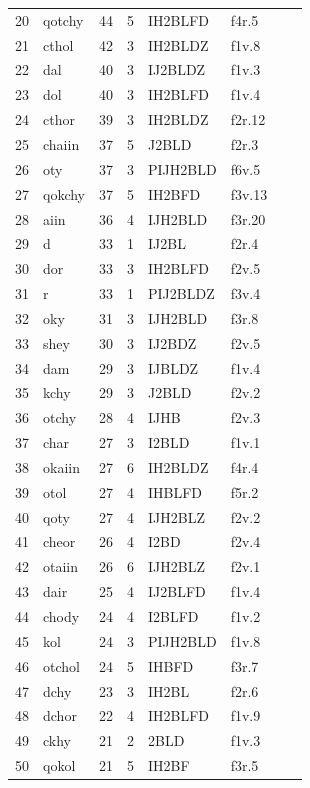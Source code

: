 \documentclass[11pt,a4paper]{article}
\begin{document}
\begin{landscape}
\begin{longtable}{@{}r>{\ttfamily}lrrl>{\ttfamily}l>{\raggedright\arraybackslash}p{80mm}>{\raggedright\arraybackslash}p{36mm}@{}}
20 & qotchy & 44 & 5 & IH2BLFD & f4r.5 &  & \\
21 & cthol & 42 & 3 & IH2BLDZ & f1v.8 &  & \\
22 & dal & 40 & 3 & IJ2BLDZ & f1v.3 &  & \\
23 & dol & 40 & 3 & IH2BLFD & f1v.4 &  & \\
24 & cthor & 39 & 3 & IH2BLDZ & f2r.12 &  & \\
25 & chaiin & 37 & 5 & J2BLD & f2r.3 &  & \\
26 & oty & 37 & 3 & PIJH2BLD & f6v.5 &  & \\
27 & qokchy & 37 & 5 & IH2BFD & f3v.13 &  & \\
28 & aiin & 36 & 4 & IJH2BLD & f3r.20 &  & \\
29 & d & 33 & 1 & IJ2BL & f2r.4 &  & \\
30 & dor & 33 & 3 & IH2BLFD & f2v.5 &  & \\
31 & r & 33 & 1 & PIJ2BLDZ & f3v.4 &  & \\
32 & oky & 31 & 3 & IJH2BLD & f3r.8 &  & \\
33 & shey & 30 & 3 & IJ2BDZ & f2v.5 &  & \\
34 & dam & 29 & 3 & IJBLDZ & f1v.4 &  & \\
35 & kchy & 29 & 3 & J2BLD & f2v.2 &  & \\
36 & otchy & 28 & 4 & IJHB & f2v.3 &  & \\
37 & char & 27 & 3 & I2BLD & f1v.1 &  & \\
38 & okaiin & 27 & 6 & IH2BLDZ & f4r.4 &  & \\
39 & otol & 27 & 4 & IHBLFD & f5r.2 &  & \\
40 & qoty & 27 & 4 & IJH2BLZ & f2v.2 &  & \\
41 & cheor & 26 & 4 & I2BD & f2v.4 &  & \\
42 & otaiin & 26 & 6 & IJH2BLZ & f2v.1 &  & \\
43 & dair & 25 & 4 & IJ2BLFD & f1v.4 &  & \\
44 & chody & 24 & 4 & I2BLFD & f1v.2 &  & \\
45 & kol & 24 & 3 & PIJH2BLD & f1v.8 &  & \\
46 & otchol & 24 & 5 & IHBFD & f3r.7 &  & \\
47 & dchy & 23 & 3 & IH2BL & f2r.6 &  & \\
48 & dchor & 22 & 4 & IH2BLFD & f1v.9 &  & \\
49 & ckhy & 21 & 2 & 2BLD & f1v.3 &  & \\
50 & qokol & 21 & 5 & IH2BF & f3r.5 &  & \\

\end{longtable}
\end{landscape}
\end{document}
